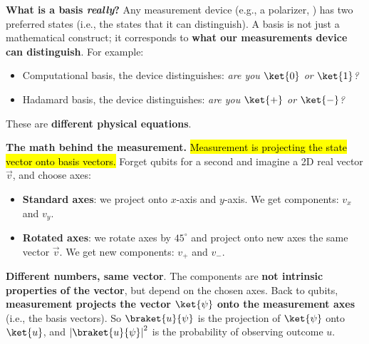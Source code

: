 \highspace
\textcolor{Green3}{ \textbf{What is a basis \emph{really}?}} Any measurement device (e.g., a polarizer, ) has two preferred states (i.e., the states that it can distinguish). A basis is not just a mathematical construct; it corresponds to \textbf{what our measurements device can distinguish}. For example:
\begin{itemize}
    \item Computational basis, the device distinguishes: \emph{are you $\ket{0}$ or $\ket{1}$?}
    \item Hadamard basis, the device distinguishes: \emph{are you $\ket{+}$ or $\ket{-}$?}
\end{itemize}
These are \textbf{different physical equations}.

\highspace
\textcolor{Green3}{ \textbf{The math behind the measurement.}} \hl{Measurement is projecting the state vector onto basis vectors.} Forget qubits for a second and imagine a 2D real vector $\vec{v}$, and choose axes:
\begin{itemize}
    \item \textbf{Standard axes}: we project onto $x$-axis and $y$-axis. We get components: $v_x$ and $v_y$.
    \item \textbf{Rotated axes}: we rotate axes by ${45}^\circ$ and project onto new axes the same vector $\vec{v}$. We get new components: $v_{+}$ and $v_{-}$.
\end{itemize}
\textbf{Different numbers, same vector}. The components are \textbf{not intrinsic properties of the vector}, but depend on the chosen axes. Back to qubits, \textbf{measurement projects the vector $\ket{\psi}$ onto the measurement axes} (i.e., the basis vectors). So $\braket{u}{\psi}$ is the projection of $\ket{\psi}$ onto $\ket{u}$, and $\left|\braket{u}{\psi}\right|^2$ is the probability of observing outcome $u$.

